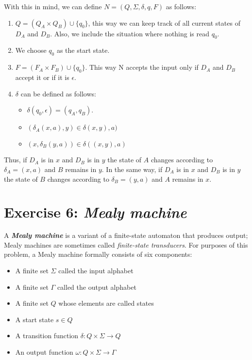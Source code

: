 \documentclass[12pt]{article}
\begin{document}
With this in mind, we can define $N = (Q, \Sigma, \delta, q, F)$ as follows:
\begin{enumerate}
\item $Q = (Q_A \times Q_B) \cup  \{q_0\}$, this way we can keep track of all current states of $D_A$ and $D_B$.  Also, we include the situation where nothing is read $q_0$.
\item We choose $q_0$  as the start state.
\item $F = (F_A \times F_B) \cup \{q_0\}$. This way N accepts the input only if  $D_A$ and $D_B$ accept it or if it is $\epsilon$.
\item $\delta$ can be defined as follows:
\begin{itemize}
    \item $\delta(q_0, \epsilon)=(q_A, q_B)$.
    \item $(\delta_A(x, a), y) \in \delta(x, y), a)$
    \item $(x, \delta_B(y,a)) \in \delta((x, y), a)$
\end{itemize}
\end{enumerate}
Thus, if $D_A$ is in $x$ and $D_B$ is in $y$  the state of $A$ changes according to $\delta_A=(x, a)$ and $B$ remains in $y$. In the same way, if  $D_A$ is in $x$ and $D_B$ is in $y$  the state of $B$ changes according to $\delta_B=(y, a)$ and $A$ remains in $x$.

\section{Exercise 6: \textit{Mealy machine}}

A \textbf{\textit{Mealy machine}} is a variant of a finite-state automaton that produces output; Mealy machines are sometimes called \textit{finite-state transducers}. For purposes of this problem, a Mealy machine formally consists of six components:

\begin{itemize}
    \item A finite set $\Sigma$ called the input alphabet
    \item A finite set $\Gamma$ called the output alphabet
    \item A finite set $Q$ whose elements are called states
    \item A start state $s \in Q$
    \item A transition function $\delta: Q \times \Sigma \rightarrow Q$
    \item An output function $\omega: Q \times \Sigma \rightarrow \Gamma$
\end{itemize} 
\end{document}
